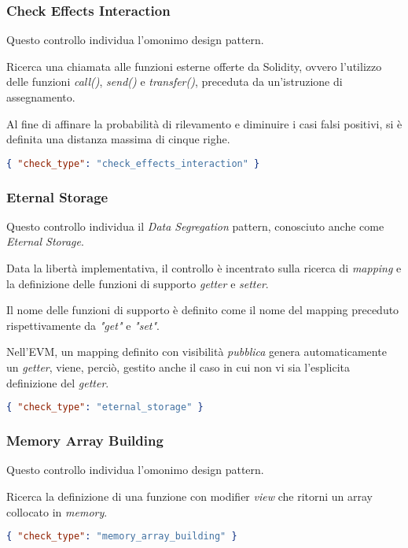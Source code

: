 \subsubsection{Check Effects Interaction}
Questo controllo individua l'omonimo design pattern.\par Ricerca una chiamata alle funzioni esterne offerte da Solidity, ovvero l'utilizzo delle funzioni \textit{call()}, \textit{send()} e \textit{transfer()}, preceduta da un'istruzione di assegnamento.\par Al fine di affinare la probabilità di rilevamento e diminuire i casi falsi positivi, si è definita una distanza massima di cinque righe.
{\begin{lstlisting}[language=json, caption={Controllo Check Effects Interaction}]
{ "check_type": "check_effects_interaction" }\end{lstlisting}}

\subsubsection{Eternal Storage}
Questo controllo individua il \textit{Data Segregation} pattern, conosciuto anche come \textit{Eternal Storage}.\par Data la libertà implementativa, il controllo è incentrato sulla ricerca di \textit{mapping} e la definizione delle funzioni di supporto \textit{getter} e \textit{setter}.\par
Il nome delle funzioni di supporto è definito come il nome del mapping preceduto rispettivamente da \textit{"get"} e \textit{"set"}.\par
Nell'EVM, un mapping definito con visibilità \textit{pubblica} genera automaticamente un \textit{getter}, viene, perciò, gestito anche il caso in cui non vi sia l'esplicita definizione del \textit{getter}. 
{\begin{lstlisting}[language=json, caption={Controllo Eternal Storage}]
{ "check_type": "eternal_storage" }\end{lstlisting}}
	
\subsubsection{Memory Array Building}
Questo controllo individua l'omonimo design pattern.\par Ricerca la definizione di una funzione con modifier \textit{view} che ritorni un array collocato in \textit{memory}.
{\begin{lstlisting}[language=json, caption={Controllo Memory Array Building}]
{ "check_type": "memory_array_building" }\end{lstlisting}}
	
